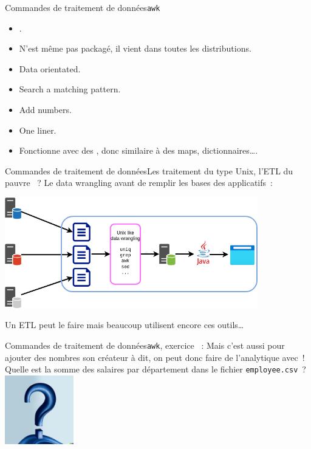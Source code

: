 \documentclass{beamer}
\begin{document}
    \begin{frame}{Commandes de traitement de données}{\lstinline{awk}}
        \begin{itemize}
            \item {}.
            \item N'est même pas packagé, il vient dans toutes les distributions.
            \item Data orientated.
            \item Search a matching pattern.
            \item Add numbers.
            \item One liner.
            \item Fonctionne avec des , donc similaire à des maps, dictionnaires\ldots.
        \end{itemize}
    \end{frame}

    \begin{frame}{Commandes de traitement de données}{Les traitement du type Unix, l'ETL du pauvre ~?}
        Le data wrangling avant de remplir les bases des applicatifs~:
        \begin{center}
            \includegraphics[width=11cm]{image/pre-traitement-unix.drawio}
        \end{center}
        Un ETL peut le faire mais beaucoup utilisent encore ces outils\ldots
    \end{frame}

    \begin{frame}{Commandes de traitement de données}{\lstinline{awk}, exercice \execcounterdispinc{}~:}
        Mais c'est aussi pour ajouter des nombres son créateur à dit, on peut donc faire de l'analytique avec~!
        \bigbreak
        Quelle est la somme des salaires par département dans le fichier \lstinline{employee.csv}~?
        \bigbreak
        \centering
        \includegraphics[width=3cm]{image/question-mark-on-a-blank-background.png}
    \end{frame}
\end{document}
